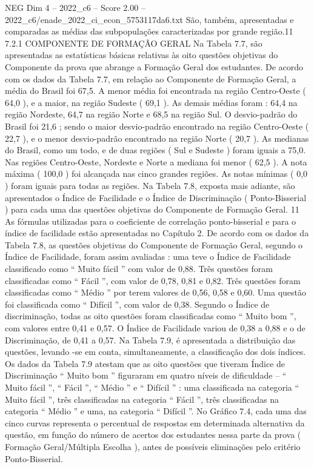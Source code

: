 \begin{textsample}{NEG Dim 4 – 2022\_c6 – Score 2.00 – 2022\_c6/enade\_2022\_ci\_econ\_5753117da6.txt}
São, também, apresentadas e comparadas as médias das subpopulações caracterizadas por grande região.11 7.2.1 COMPONENTE DE FORMAÇÃO GERAL Na Tabela 7.7, são apresentadas as estatísticas básicas relativas às oito questões objetivas do Componente da prova que abrange a Formação Geral dos estudantes.
De acordo com os dados da Tabela 7.7, em relação ao Componente de Formação Geral, a média do Brasil foi 67,5.
A menor média foi encontrada na região Centro-Oeste ( 64,0 ), e a maior, na região Sudeste ( 69,1 ).
As demais médias foram : 64,4 na região Nordeste, 64,7 na região Norte e 68,5 na região Sul.
O desvio-padrão do Brasil foi 21,6 ; sendo o maior desvio-padrão encontrado na região Centro-Oeste ( 22,7 ), e o menor desvio-padrão encontrado na região Norte ( 20,7 ).
As medianas do Brasil, como um todo, e de duas regiões ( Sul e Sudeste ) foram iguais a 75,0.
Nas regiões Centro-Oeste, Nordeste e Norte a mediana foi menor ( 62,5 ).
A nota máxima ( 100,0 ) foi alcançada nas cinco grandes regiões.
As notas mínimas ( 0,0 ) foram iguais para todas as regiões.
Na Tabela 7.8, exposta mais adiante, são apresentados o Índice de Facilidade e o Índice de Discriminação ( Ponto-Bisserial ) para cada uma das questões objetivas do Componente de Formação Geral. 11 As fórmulas utilizadas para o coeficiente de correlação ponto-bisserial e para o índice de facilidade estão apresentadas no Capítulo 2.
De acordo com os dados da Tabela 7.8, as questões objetivas do Componente de Formação Geral, segundo o Índice de Facilidade, foram assim avaliadas : uma teve o Índice de Facilidade classificado como “ Muito fácil ” com valor de 0,88.
Três questões foram classificadas como “ Fácil ”, com valor de 0,78, 0,81 e 0,82.
Três questões foram classificadas como “ Médio ” por terem valores de 0,56, 0,58 e 0,60.
Uma questão foi classificada como “ Difícil ”, com valor de 0,38.
Segundo o Índice de discriminação, todas as oito questões foram classificadas como “ Muito bom ”, com valores entre 0,41 e 0,57.
O Índice de Facilidade variou de 0,38 a 0,88 e o de Discriminação, de 0,41 a 0,57.
Na Tabela 7.9, é apresentada a distribuição das questões, levando -se em conta, simultaneamente, a classificação dos dois índices.
Os dados da Tabela 7.9 atestam que as oito questões que tiveram Índice de Discriminação “ Muito bom ” figuraram em quatro níveis de dificuldade – “ Muito fácil ”, “ Fácil ”, “ Médio ” e “ Difícil ” : uma classificada na categoria “ Muito fácil ”, três classificadas na categoria “ Fácil ”, três classificadas na categoria “ Médio ” e uma, na categoria “ Difícil ”.
No Gráfico 7.4, cada uma das cinco curvas representa o percentual de respostas em determinada alternativa da questão, em função do número de acertos dos estudantes nessa parte da prova ( Formação Geral/Múltipla Escolha ), antes de possíveis eliminações pelo critério Ponto-Bisserial.

\end{textsample}
